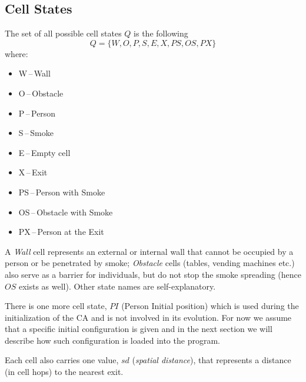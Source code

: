 \subsection{Cell States}
The set of all possible cell states $Q$ is the following
$$Q = \{W,O,P,S,E,X,PS,OS,PX\}$$ where:
\begin{itemize}
    \item W\,--\,Wall
    \item O\,--\,Obstacle
    \item P\,--\,Person
    \item S\,--\,Smoke
    \item E\,--\,Empty cell
    \item X\,--\,Exit
    \item PS\,--\,Person with Smoke
    \item OS\,--\,Obstacle with Smoke
    \item PX\,--\,Person at the Exit
\end{itemize}

A \emph{Wall} cell represents an external or internal wall that cannot be
occupied by a person or be penetrated by smoke; \emph{Obstacle} cells (tables,
vending machines etc.) also serve as a barrier for individuals, but do not stop
the smoke spreading (hence $OS$ exists as well).
Other state names are self-explanatory.

There is one more cell state, $PI$ (Person Initial position) which is used
during the initialization of the CA and is not involved in its evolution.
For now we assume that a specific initial configuration is given and in the next 
section we will describe how such configuration is loaded into the program.

Each cell also carries one value, $sd$ (\emph{spatial distance}), that
represents a distance (in cell hops) to the nearest exit.

